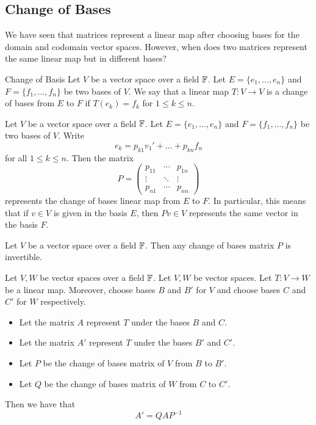 \documentclass[a4paper]{article}
\begin{document}
\subsection{Change of Bases}
We have seen that matrices represent a linear map after choosing bases for the domain and codomain vector spaces. However, when does two matrices represent the same linear map but in different bases?

\begin{defn}{Change of Basis}{} Let $V$ be a vector space over a field $\mathbb{F}$. Let $E=\{e_1,\dots,e_n\}$ and $F=\{f_1,\dots,f_n\}$ be two bases of $V$. We say that a linear map $T:V\to V$ is a change of bases from $E$ to $F$ if $T(e_k)=f_k$ for $1\leq k\leq n$. 
\end{defn}

\begin{prp}{}{} Let $V$ be a vector space over a field $\mathbb{F}$. Let $E=\{e_1,\dots,e_n\}$ and $F=\{f_1,\dots,f_n\}$ be two bases of $V$. Write $$e_k=p_{k1}v_1'+\dots+p_{kn}f_n$$ for all $1\leq k\leq n$. Then the matrix $$P=\begin{pmatrix}
p_{11}&\cdots&p_{1n}\\
\vdots&\ddots&\vdots\\
p_{n1}&\cdots&p_{nn}
\end{pmatrix}$$ represents the change of bases linear map from $E$ to $F$. In particular, this means that if $v\in V$ is given in the basis $E$, then $Pv\in V$ represents the same vector in the basis $F$. 
\end{prp}

\begin{lmm}{}{} Let $V$ be a vector space over a field $\mathbb{F}$. Then any change of bases matrix $P$ is invertible. 
\end{lmm}

\begin{thm}{}{} Let $V,W$ be vector spaces over a field $\mathbb{F}$. Let $V,W$ be vector spaces. Let $T:V\to W$ be a linear map. Moreover, choose bases $B$ and $B'$ for $V$ and choose bases $C$ and $C'$ for $W$ respectively. 
\begin{itemize}
\item Let the matrix $A$ represent $T$ under the bases $B$ and $C$. 
\item Let the matrix $A'$ represent $T$ under the bases $B'$ and $C'$. 
\item Let $P$ be the change of bases matrix of $V$ from $B$ to $B'$. 
\item Let $Q$ be the change of bases matrix of $W$ from $C$ to $C'$. 
\end{itemize}
Then we have that $$A'=QAP^{-1}$$
\end{thm}
\end{document}
